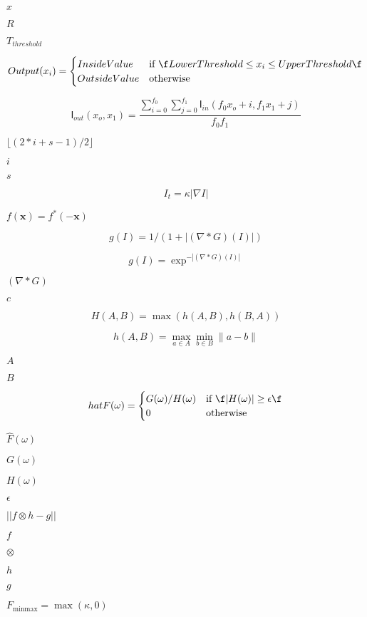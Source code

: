\documentclass{article}
\begin{document}
$ x $
\pagebreak

$ R $
\pagebreak

$ T_{threshold} $
\pagebreak

\[ Output(x_i) = \begin{cases} InsideValue & \text{if \f$LowerThreshold \leq x_i \leq UpperThreshold\f$} \\ OutsideValue & \text{otherwise} \end{cases} \]
\pagebreak

\[ \mathsf{I}_{out}(x_o,x_1) = \frac{\sum_{i=0}^{f_0}\sum_{j=0}^{f_1}\mathsf{I}_{in}(f_0 x_o+i,f_1 x_1+j)}{f_0 f_1} \]
\pagebreak

$ \lfloor (2*i+s-1)/2 \rfloor $
\pagebreak

$i$
\pagebreak

$s$
\pagebreak

\[ I_t = \kappa |\nabla I| \]
\pagebreak

$ f(\mathbf{x}) = f^*(-\mathbf{x}) $
\pagebreak

\[ g(I) = 1 / ( 1 + | (\nabla * G)(I)| ) \]
\pagebreak

\[ g(I) = \exp^{-|(\nabla * G)(I)|} \]
\pagebreak

$ (\nabla * G) $
\pagebreak

$ c $
\pagebreak

\[ H(A,B) = \max(h(A,B),h(B,A)) \]
\pagebreak

\[ h(A,B) = \max_{a \in A} \min_{b \in B} \| a - b\| \]
\pagebreak

$A$
\pagebreak

$B$
\pagebreak

\[ hat{F}(\omega) = \begin{cases} G(\omega) / H(\omega) & \text{if \f$|H(\omega)| \geq \epsilon\f$} \\ 0 & \text{otherwise} \end{cases} \]
\pagebreak

$\hat{F}(\omega)$
\pagebreak

$G(\omega)$
\pagebreak

$H(\omega)$
\pagebreak

$\epsilon$
\pagebreak

$||f \otimes h - g||$
\pagebreak

$f$
\pagebreak

$\otimes$
\pagebreak

$h$
\pagebreak

$g$
\pagebreak

$ F_{\mbox{minmax}} = \max(\kappa,0) $
\pagebreak
\end{document}
